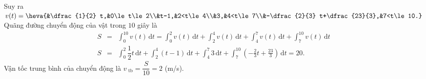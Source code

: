 \begin{bt}
{		Suy ra  $v(t)=\heva{&\dfrac{1}{2} t,&0\le t\le 2\\&t-1,&2<t\le 4\\&3,&4<t\le 7\\&-\dfrac{2}{3} t+\dfrac{23}{3},&7<t\le 10.}$\\
		Quãng đường chuyển động của vật  trong $10$ giây là
		\begin{eqnarray*}
			S&=&\displaystyle\int_0^{10} v(t)\mathrm{\, d}t=\displaystyle\int_0^2 v(t)\mathrm{\, d}t+\displaystyle\int_2^4 v(t)\mathrm{\, d}t+\displaystyle\int_4^7 v(t)\mathrm{\,  d}t+\displaystyle\int_7^{10} v(t)\mathrm{\, d}t\\
			S&=&\displaystyle\int_0^2 \dfrac{1}{2}  t \mathrm{\, d} t+\displaystyle\int_2^4(t-1)\mathrm{\, d}t+\displaystyle\int_4^7 3 \mathrm{\, d} t+\displaystyle\int_7^{10}\left(-\frac{2}{3} t+\frac{23}{3}\right)\mathrm{\, d}t=20.
		\end{eqnarray*}
		Vận tốc trung bình của chuyển động là $v_{\text{ tb}}=\dfrac{S}{10}=2$ (m/s). 
	} 
\end{bt}

